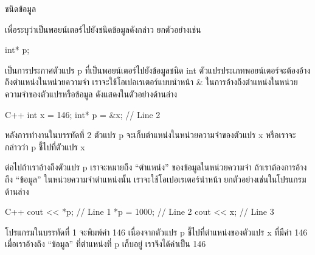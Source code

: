 \begin{center}
ชนิด{\wbr}ข้อมูล{\ct *}
\end{center}

เพื่อ{\wbr}ระบุ{\wbr}ว่า{\wbr}เป็น{\wbr}พอยน์เตอร์{\wbr}ไป{\wbr}ยัง{\wbr}ชนิด{\wbr}ข้อมูล{\wbr}ดัง{\wbr}กล่าว  ยก{\wbr}ตัวอย่าง{\wbr}เช่น{\wbr}

\begin{center}
{\ct int* p;}
\end{center}

เป็น{\wbr}การ{\wbr}ประกาศ{\wbr}ตัวแปร {\ct p} ที่{\wbr}เป็น{\wbr}พอยน์เตอร์{\wbr}ไป{\wbr}ยัง{\wbr}ข้อมูล{\wbr}ชนิด {\ct int}
ตัวแปร{\wbr}ประเภท{\wbr}พอยน์เตอร์{\wbr}จะ{\wbr}ต้อง{\wbr}อ้าง{\wbr}ถึง{\wbr}ตำแหน่ง{\wbr}ใน{\wbr}หน่วย{\wbr}ความ{\wbr}จำ{\wbr}
เรา{\wbr}จะ{\wbr}ใช้{\wbr}โอเปอเรเตอร์{\wbr}แบบ{\wbr}นำ{\wbr}หน้า {\ct \&}
ใน{\wbr}การ{\wbr}อ้าง{\wbr}ถึง{\wbr}ตำแหน่ง{\wbr}ใน{\wbr}หน่วย{\wbr}ความ{\wbr}จำ{\wbr}ของ{\wbr}ตัวแปร{\wbr}หรือ{\wbr}ข้อมูล  ดัง{\wbr}แสดง{\wbr}ใน{\wbr}ตัวอย่าง{\wbr}ด้าน{\wbr}ล่าง{\wbr}

\latintext
\begin{codelist}{C++}{}
int x = 146;
int* p = &x;   // Line 2
\end{codelist}
\thaitext

หลัง{\wbr}การ{\wbr}ทำงาน{\wbr}ใน{\wbr}บรรทัด{\wbr}ที่ 2 ตัวแปร {\ct p} จะ{\wbr}เก็บ{\wbr}ตำแหน่ง{\wbr}ใน{\wbr}หน่วย{\wbr}ความ{\wbr}จำ{\wbr}ของ{\wbr}ตัวแปร{\wbr}
{\ct x} หรือ{\wbr}เรา{\wbr}จะ{\wbr}กล่าว{\wbr}ว่า {\ct p} ชี้{\wbr}ไป{\wbr}ที่{\wbr}ตัวแปร {\ct x}

ต่อ{\wbr}ไป{\wbr}ถ้า{\wbr}เรา{\wbr}อ้าง{\wbr}ถึง{\wbr}ตัวแปร {\ct p} เรา{\wbr}จะ{\wbr}หมาย{\wbr}ถึง ``ตำแหน่ง'' ของ{\wbr}ข้อมูล{\wbr}ใน{\wbr}หน่วย{\wbr}ความ{\wbr}จำ{\wbr}
ถ้า{\wbr}เรา{\wbr}ต้องการ{\wbr}อ้าง{\wbr}ถึง ``ข้อมูล'' ใน{\wbr}หน่วย{\wbr}ความ{\wbr}จำ{\wbr}ตำแหน่ง{\wbr}นั้น เรา{\wbr}จะ{\wbr}ใช้{\wbr}โอเปอเรเตอร์{\wbr}นำ{\wbr}หน้า{\wbr}
{\ct *} ยก{\wbr}ตัวอย่าง{\wbr}เช่น{\wbr}ใน{\wbr}โปรแกรม{\wbr}ด้าน{\wbr}ล่าง{\wbr}

\latintext
\begin{codelist}{C++}{}
cout << *p;       // Line 1
*p = 1000;        // Line 2
cout << x;        // Line 3
\end{codelist}
\thaitext

โปรแกรม{\wbr}ใน{\wbr}บรรทัด{\wbr}ที่ 1 จะ{\wbr}พิมพ์{\wbr}ค่า 146 เนื่อง{\wbr}จาก{\wbr}ตัวแปร {\ct p} ชี้{\wbr}ไป{\wbr}ที่{\wbr}ตำแหน่ง{\wbr}ของ{\wbr}ตัวแปร{\wbr}
{\ct x} ที่{\wbr}มี{\wbr}ค่า 146 เมื่อ{\wbr}เรา{\wbr}อ้าง{\wbr}ถึง ``ข้อมูล'' ที่{\wbr}ตำแหน่ง{\wbr}ที่ {\ct p} เก็บ{\wbr}อยู่{\wbr}
เรา{\wbr}จึง{\wbr}ได้{\wbr}ค่า{\wbr}เป็น 146

